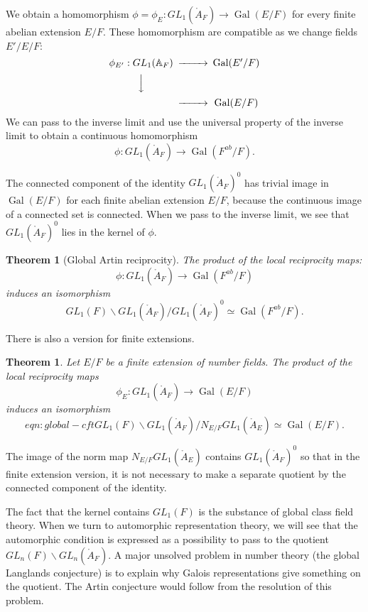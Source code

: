 \documentclass{amsart}
\newtheorem{theorem}[equation]{Theorem}
\def\op#1{{\operatorname{#1}}}
\def\AA{\ring{A}}
\def\oG{\op{Gal}}
\begin{document}
We obtain a homomorphism $\phi = \phi_E:GL_1(\AA_F)\to \oG(E/F)$ for every finite
abelian extension $E/F$.  These homomorphism are compatible as we change fields $E'/E/F$:
\[
\begin{CD}
\phi_{E'}: GL_1(\AA_F) @>>> \oG(E'/F)\\
@VVV \\
@>>> \oG(E/F)\\
\end{CD}
\]
We can pass to the inverse limit and use the universal property of the inverse limit to
obtain a continuous homomorphism
\[
\phi: GL_1(\AA_F) \to \oG(F^{ab}/F).
\]

The connected component of the identity $GL_1(\AA_F)^0$ has trivial image in
$\oG(E/F)$ for each finite abelian extension $E/F$, because the continuous image
of a connected set is connected.  When we pass to the inverse limit, we see that
$GL_1(\AA_F)^0$ lies in the kernel of $\phi$.

\begin{theorem}[Global Artin reciprocity]  The product of the local reciprocity maps:
\[
\phi:GL_1(\AA_F)\to \oG(F^{ab}/F)
\]
induces an isomorphism
\[
GL_1(F)\backslash GL_1(\AA_F)/ GL_1(\AA_F)^0 \simeq \oG(F^{ab}/F).
\]
\end{theorem}

There is also a  version for finite extensions.

\begin{theorem} Let $E/F$ be a finite extension of number fields.  The product of
the local reciprocity maps
\[
\phi_E:GL_1(\AA_F)\to \oG(E/F)
\]
induces an isomorphism
\begin{equation}{eqn:global-cft}
GL_1(F)\backslash GL_1(\AA_F)/ N_{E/F} GL_1(\AA_E) \simeq \oG(E/F).
\end{equation}
\end{theorem}

The image of the norm map $N_{E/F} GL_1(\AA_E)$ contains $GL_1(\AA_F)^0$ so 
that in the finite extension version, it is not necessary to make a separate quotient
by the connected component of the identity.

The fact that the kernel contains $GL_1(F)$ is the substance of global class field theory.
When we turn to automorphic representation theory, we will see that the automorphic
condition is expressed as a possibility to pass to the quotient $GL_n(F)\backslash GL_n(\AA_F)$.
A major unsolved problem in number theory (the global Langlands conjecture) is to
explain why Galois representations give something on the quotient.
The Artin conjecture would follow from the resolution of this problem.
\end{document}
